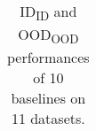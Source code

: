 \documentclass{article}
\begin{document}
\begin{table}[ht]
{\begin{tabular}{lllccccccccccccccc}
    \bottomrule[2pt]
    \end{tabular}}
    \caption{
        ID\textsubscript{ID} and OOD\textsubscript{OOD} performances of 10 baselines on 11 datasets.
    }
\end{table}
\end{document}
